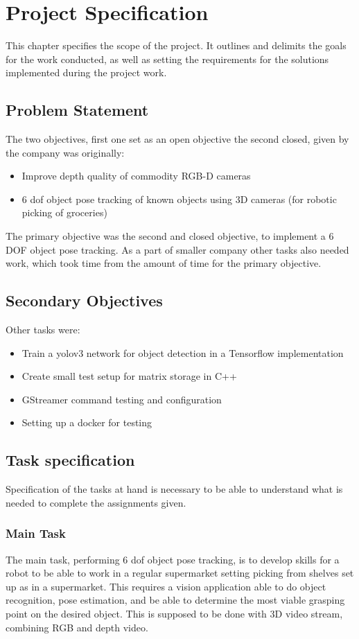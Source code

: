 \chapter{Project Specification}\label{ch:projectspec}\glsresetall
This chapter specifies the scope of the project. It outlines and delimits the goals for the work conducted, as well as setting the requirements for the solutions implemented during the project work. \\

\section{Problem Statement}
The two objectives, first one set as an open objective the second closed, given by the company was originally:
\begin{itemize}
	\item Improve depth quality of commodity RGB-D cameras
	\item 6 \gls{dof} object pose tracking of known objects using 3D cameras (for robotic picking of groceries)
\end{itemize}

The primary objective was the second and closed objective, to implement a 6 DOF object pose tracking.
As a part of smaller company other tasks also needed work, which took time from the amount of time for the primary objective. 

\section{Secondary Objectives}
Other tasks were:
\begin{itemize}
	\item Train a \gls{yolo}v3 network for object detection in a Tensorflow implementation
	\item Create small test setup for matrix storage in C++
	\item GStreamer command testing and configuration
	\item Setting up a docker for testing
\end{itemize}

\section{Task specification}
Specification of the tasks at hand is necessary to be able to understand what is needed to complete the assignments given.

\subsection{Main Task}
The main task, performing 6 \gls{dof} object pose tracking, is to develop skills for a robot to be able to work in a regular supermarket setting picking from shelves set up as in a supermarket. This requires a vision application able to do object recognition, pose estimation, and be able to determine the most viable grasping point on the desired object. 
This is supposed to be done with 3D video stream, combining RGB and depth video. 

